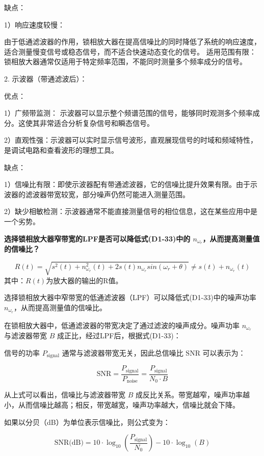 \documentclass[dvipsnames, svgnames,a4paper,11pt]{article}
\begin{document}
	缺点：

	1）响应速度较慢：
	
	由于低通滤波器的作用，锁相放大器在提高信噪比的同时降低了系统的响应速度，适合测量慢变信号或稳态信号，而不适合快速动态变化的信号。
	适用范围有限：锁相放大器通常仅适用于特定频率范围，不能同时测量多个频率成分的信号。
	
	2. 示波器（带通滤波后）：

	优点：

	1）广频带监测：
	示波器可以显示整个频谱范围的信号，能够同时观测多个频率成分。这使其非常适合分析复杂信号和瞬态信号。
	
	2）直观性强：示波器可以实时显示信号波形，直观展现信号的时域和频域特性，是调试电路和查看波形的理想工具。
	
	缺点：

	1）信噪比有限：即使示波器配有带通滤波器，它的信噪比提升效果有限。由于示波器的滤波器带宽较宽，部分噪声仍然可能进入测量范围。
	
	2）缺少相敏检测：示波器通常不能直接测量信号的相位信息，这在某些应用中是一个劣势。

	\vspace{1cm}
	\textbf{选择锁相放大器窄带宽的LPF是否可以降低式(D1-33)中的 $n _{\omega_r}$，从而提高测量值的信噪比？}

	\begin{equation}
		R(t)= \sqrt{s^2(t) + n^2_{\omega_r} (t) + 2s(t)n _{\omega_r} sin(\omega_r + \theta)}
		\ne s(t)+ n_{\omega_r}(t)
		\label{eq:33}
	\end{equation}
其中：$R(t)$为放大器的输出的R值。
	
	选择锁相放大器中窄带宽的低通滤波器（LPF）可以降低式(D1-33)中的噪声功率 $n _{\omega_r}$，从而提高测量值的信噪比。
	
	在锁相放大器中，低通滤波器的带宽决定了通过滤波的噪声成分。噪声功率 $n _{\omega_r}$ 与滤波器带宽 \(B\) 成正比，经过LPF后，根据式(D1-33)：
	

		信号的功率 \( P_{\text{signal}} \) 通常与滤波器带宽无关，因此总信噪比 \( \text{SNR} \) 可以表示为：
		
		\[
		\text{SNR} = \frac{P_{\text{signal}}}{P_{\text{noise}}} = \frac{P_{\text{signal}}}{N_0 \cdot B}
		\]
		
		从上式可以看出，信噪比与滤波器带宽 \( B \) 成反比关系。带宽越窄，噪声功率越小，从而信噪比越高；相反，带宽越宽，噪声功率越大，信噪比就会下降。

		如果以分贝（dB）为单位表示信噪比，则公式变为：

		\[
		\text{SNR(dB)} = 10 \cdot \log_{10}\left(\frac{P_{\text{signal}}}{N_0}\right) - 10 \cdot \log_{10}(B)
		\]
		
\end{document}
